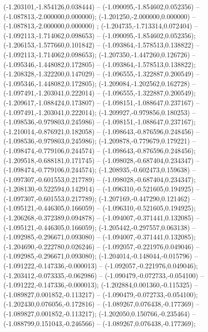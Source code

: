  (-1.203101,-1.854126,0.038444) -- (-1.090095,-1.854602,0.052356) -- (-1.087813,-2.000000,0.000000);
 (-1.201250,-2.000000,0.000000) -- (-1.087813,-2.000000,0.000000) ;
 (-1.204735,-1.713314,0.072404) -- (-1.092113,-1.714062,0.098653) -- (-1.090095,-1.854602,0.052356);
 (-1.206153,-1.577660,0.101842) -- (-1.093864,-1.578513,0.138822) -- (-1.092113,-1.714062,0.098653);
 (-1.207350,-1.447260,0.126726) -- (-1.095346,-1.448082,0.172805) -- (-1.093864,-1.578513,0.138822);
 (-1.208328,-1.322200,0.147029) -- (-1.096555,-1.322887,0.200549) -- (-1.095346,-1.448082,0.172805);
 (-1.209084,-1.202562,0.162728) -- (-1.097491,-1.203041,0.222014) -- (-1.096555,-1.322887,0.200549);
 (-1.209617,-1.088424,0.173807) -- (-1.098151,-1.088647,0.237167) -- (-1.097491,-1.203041,0.222014);
 (-1.209927,-0.979856,0.180253) -- (-1.098536,-0.979803,0.245986) -- (-1.098151,-1.088647,0.237167);
 (-1.210014,-0.876921,0.182058) -- (-1.098643,-0.876596,0.248456) -- (-1.098536,-0.979803,0.245986);
 (-1.209878,-0.779679,0.179221) -- (-1.098474,-0.779106,0.244574) -- (-1.098643,-0.876596,0.248456);
 (-1.209518,-0.688181,0.171745) -- (-1.098028,-0.687404,0.234347) -- (-1.098474,-0.779106,0.244574);
 (-1.208935,-0.602473,0.159638) -- (-1.097307,-0.601553,0.217789) -- (-1.098028,-0.687404,0.234347);
 (-1.208130,-0.522594,0.142914) -- (-1.096310,-0.521605,0.194925) -- (-1.097307,-0.601553,0.217789);
 (-1.207169,-0.447290,0.121462) -- (-1.095121,-0.446305,0.166059) -- (-1.096310,-0.521605,0.194925);
 (-1.206268,-0.372389,0.094878) -- (-1.094007,-0.371441,0.132085) -- (-1.095121,-0.446305,0.166059);
 (-1.205442,-0.297557,0.063138) -- (-1.092985,-0.296671,0.093080) -- (-1.094007,-0.371441,0.132085);
 (-1.204690,-0.222780,0.026246) -- (-1.092057,-0.221976,0.049046) -- (-1.092985,-0.296671,0.093080);
 (-1.204014,-0.148044,-0.015796) -- (-1.091222,-0.147336,-0.000013) -- (-1.092057,-0.221976,0.049046);
 (-1.203412,-0.073335,-0.062986) -- (-1.090479,-0.072733,-0.054100) -- (-1.091222,-0.147336,-0.000013);
 (-1.202884,0.001360,-0.115325) -- (-1.089827,0.001852,-0.113217) -- (-1.090479,-0.072733,-0.054100);
 (-1.202430,0.076056,-0.172816) -- (-1.089267,0.076438,-0.177369) -- (-1.089827,0.001852,-0.113217);
 (-1.202050,0.150766,-0.235464) -- (-1.088799,0.151043,-0.246566) -- (-1.089267,0.076438,-0.177369);
